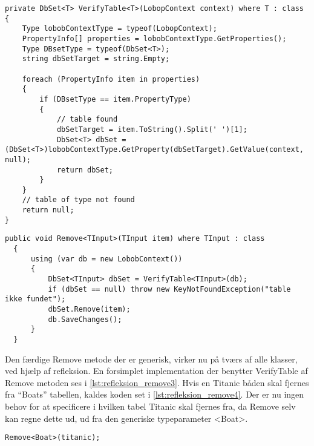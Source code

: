 \begin{lstlisting}[label=lst:refleksion_verifytable, caption={Metode der tjekker om en tabel af typen T findes i databasen.}]
private DbSet<T> VerifyTable<T>(LobopContext context) where T : class
{
    Type lobobContextType = typeof(LobopContext);
    PropertyInfo[] properties = lobobContextType.GetProperties();
    Type DBsetType = typeof(DbSet<T>);
    string dbSetTarget = string.Empty;

    foreach (PropertyInfo item in properties)
    {
        if (DBsetType == item.PropertyType)
        {
            // table found
            dbSetTarget = item.ToString().Split(' ')[1];
            DbSet<T> dbSet = (DbSet<T>)lobobContextType.GetProperty(dbSetTarget).GetValue(context, null);
            return dbSet;
        }
    }
    // table of type not found
    return null;
}
\end{lstlisting}

\begin{lstlisting}[label=lst:refleksion_remove3, caption={Remove metode der kan tage en vilkårlig klasse ind, finde den rette tabel og derefter slette det parametiserede objekt}]
  public void Remove<TInput>(TInput item) where TInput : class
  {
      using (var db = new LobobContext())
      {
          DbSet<TInput> dbSet = VerifyTable<TInput>(db);
          if (dbSet == null) throw new KeyNotFoundException("table ikke fundet");
          dbSet.Remove(item);
          db.SaveChanges();
      }
  } 
\end{lstlisting}

Den færdige Remove metode der er generisk, virker nu på tværs af alle klasser, ved hjælp af refleksion. En forsimplet implementation der benytter VerifyTable af Remove metoden ses i \cref{lst:refleksion_remove3}. Hvis en Titanic båden skal fjernes fra \enquote{Boats} tabellen, kaldes koden set i \cref{lst:refleksion_remove4}. Der er nu ingen behov for at specificere i hvilken tabel Titanic skal fjernes fra, da Remove selv kan regne dette ud, ud fra den generiske typeparameter <Boat>.

\begin{lstlisting}[label=lst:refleksion_remove4]
Remove<Boat>(titanic);
\end{lstlisting}

